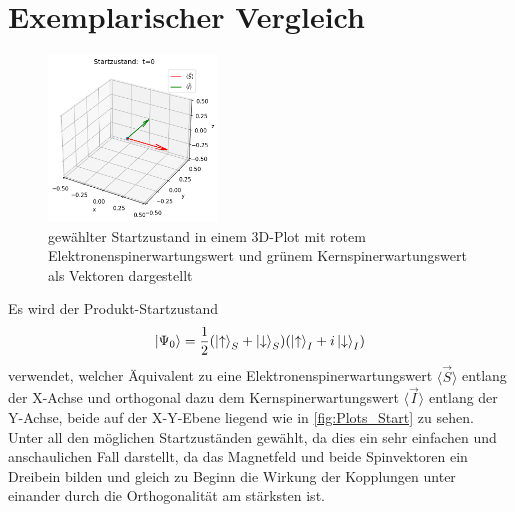 \section{Exemplarischer Vergleich}
\begin{figure}
    \centering
    \includegraphics[width = 0.4\textwidth]{Abbildungen/Plot_Vektor_Start.png}
    \caption{gewählter Startzustand in einem 3D-Plot mit rotem Elektronenspinerwartungswert und grünem Kernspinerwartungswert als Vektoren dargestellt}
    \label{fig:Plots_Start}
\end{figure}
Es wird der Produkt-Startzustand 
\begin{align}
    \ket{\Psi_0}=\frac{1}{2}(\ket{\uparrow}_S + \ket{\downarrow}_S)(\ket{\uparrow}_I + i\ket{\downarrow}_I)
\end{align}
verwendet, welcher Äquivalent zu eine Elektronenspinerwartungswert $\langle\vec{S}\rangle$ entlang der X-Achse und orthogonal
dazu dem Kernspinerwartungswert $\langle\vec{I}\rangle$ entlang der Y-Achse, beide auf der X-Y-Ebene liegend wie in \autoref{fig:Plots_Start} zu sehen.
Unter all den möglichen Startzuständen gewählt, da dies ein sehr einfachen und anschaulichen Fall darstellt, da das Magnetfeld und beide Spinvektoren 
ein Dreibein bilden und gleich zu Beginn die Wirkung der Kopplungen unter einander durch die Orthogonalität am stärksten ist.

